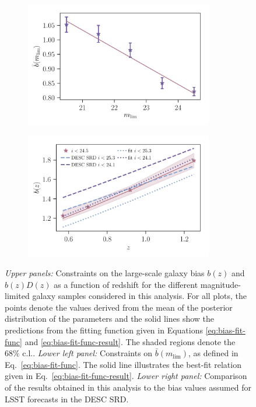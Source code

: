 \documentclass[a4paper,11pt]{article}
\begin{document}
\begin{figure}
\begin{center}
\begin{subfigure}{0.48\textwidth}
       \includegraphics[width=0.9\textwidth]{figures/bias-mlim_mPk=HOD_fix=alpha-fc-sigmaM_HOD=zevol_fit=pz-shifts-pz-widths+prior=0p2_fit=auto+cross_cosmo=const_cov=G+NG+SSC-LINBIAS_HOD-param=zfid_clfit=HOD-zevol_magnitude_cuts_fitting-func.pdf}
       \end{subfigure}
          \begin{subfigure}{0.48\textwidth}
          \includegraphics[width=0.9\textwidth]{figures/bias-redshift_mPk=HOD_fix=alpha-fc-sigmaM_HOD=zevol_fit=pz-shifts-pz-widths+prior=0p2_fit=auto+cross_cosmo=const_cov=G+NG+SSC-LINBIAS_HOD-param=zfid_clfit=HOD-zevol_i24p5-vs-DESC-SRD.pdf}
           \end{subfigure}
        \caption{\textit{Upper panels:} Constraints on the large-scale galaxy bias $b(z)$ and $b(z)D(z)$ as a function of redshift for the different magnitude-limited galaxy samples considered in this analysis. For all plots, the points denote the values derived from the mean of the posterior distribution of the parameters and the solid lines show the predictions from the fitting function given in Equations \ref{eq:bias-fit-func} and \ref{eq:bias-fit-func-result}. The shaded regions denote the $68 \%$ c.l.. \textit{Lower left panel:} Constraints on $\bar{b}(m_{\mathrm{lim}})$, as defined in Eq.~\ref{eq:bias-fit-func}. The solid line illustrates the best-fit relation given in Eq.~\ref{eq:bias-fit-func-result}. \textit{Lower right panel:} Comparison of the results obtained in this analysis to the bias values assumed for LSST forecasts in the DESC SRD.}
        \label{fig:magnitude-cuts-bias}
      \end{center}
    \end{figure}
\end{document}
